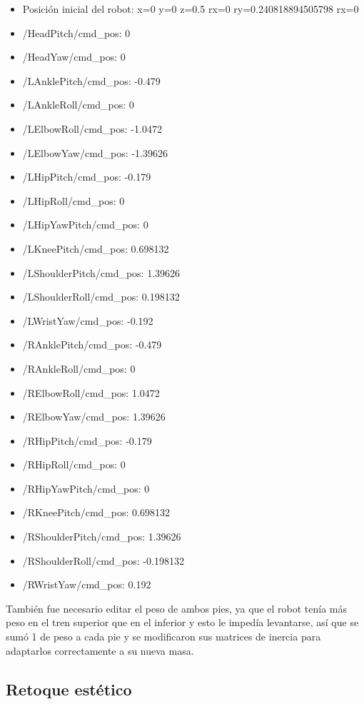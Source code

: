 \begin{itemize}
  \item Posición inicial del robot: x=0 y=0 z=0.5 rx=0 ry=0.240818894505798 rx=0
  \item /HeadPitch/cmd\_pos: 0
  \item /HeadYaw/cmd\_pos: 0
  \item /LAnklePitch/cmd\_pos: -0.479
  \item /LAnkleRoll/cmd\_pos: 0
  \item /LElbowRoll/cmd\_pos: -1.0472
  \item /LElbowYaw/cmd\_pos: -1.39626
  \item /LHipPitch/cmd\_pos: -0.179
  \item /LHipRoll/cmd\_pos: 0
  \item /LHipYawPitch/cmd\_pos: 0
  \item /LKneePitch/cmd\_pos: 0.698132
  \item /LShoulderPitch/cmd\_pos: 1.39626
  \item /LShoulderRoll/cmd\_pos: 0.198132
  \item /LWristYaw/cmd\_pos: -0.192
  \item /RAnklePitch/cmd\_pos: -0.479
  \item /RAnkleRoll/cmd\_pos: 0
  \item /RElbowRoll/cmd\_pos: 1.0472
  \item /RElbowYaw/cmd\_pos: 1.39626
  \item /RHipPitch/cmd\_pos: -0.179
  \item /RHipRoll/cmd\_pos: 0
  \item /RHipYawPitch/cmd\_pos: 0
  \item /RKneePitch/cmd\_pos: 0.698132
  \item /RShoulderPitch/cmd\_pos: 1.39626
  \item /RShoulderRoll/cmd\_pos: -0.198132
  \item /RWristYaw/cmd\_pos: 0.192
\end{itemize}

También fue necesario editar el peso de ambos pies, ya que el robot tenía más peso en el tren superior que en el inferior y esto le impedía levantarse, así que se sumó 1 de peso a cada pie y se modificaron sus matrices de inercia para adaptarlos correctamente a su nueva masa.

\subsection{Retoque estético}

